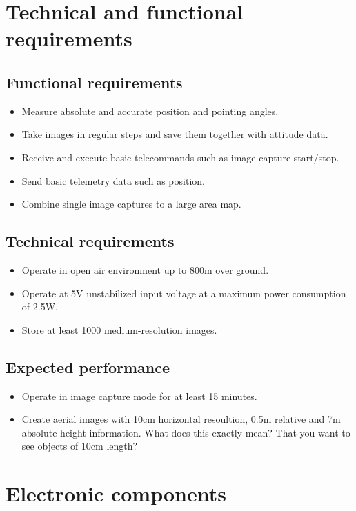 \documentclass[fontsize=11pt,paper=a4,]{scrartcl}
\begin{document}
\section{Technical and functional requirements}
\subsection{Functional requirements}
\label{sub:Functional_requirements}
\begin{itemize}
\item Measure absolute and accurate position and pointing angles.
\item Take images in regular steps and save them together with attitude data.
\item Receive and execute basic telecommands such as image capture start/stop.
\item Send basic telemetry data such as position.
\item Combine single image captures to a large area map.
\end{itemize}


\subsection{Technical requirements}
\begin{itemize}
\item Operate in open air environment up to 800m over ground.
\item Operate at 5V unstabilized input voltage at a maximum power consumption of 2.5W.
\item Store at least 1000 medium-resolution images.
\end{itemize}


\subsection{Expected performance}
\begin{itemize}
\item Operate in image capture mode for at least 15 minutes.
\item Create aerial images with 10cm horizontal resoultion, 0.5m relative and 7m absolute height information. {\color{red} What does this exactly mean? That you want to see objects of 10cm length?}
\end{itemize}

\section{Electronic components}
\end{document}
